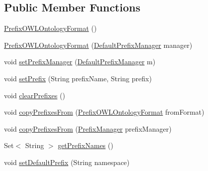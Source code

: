 \subsection*{Public Member Functions}
\begin{DoxyCompactItemize}
\item 
\hyperlink{classorg_1_1semanticweb_1_1owlapi_1_1vocab_1_1_prefix_o_w_l_ontology_format_ae2244e34e7cf323fe9a26837e640661a}{Prefix\-O\-W\-L\-Ontology\-Format} ()
\item 
\hyperlink{classorg_1_1semanticweb_1_1owlapi_1_1vocab_1_1_prefix_o_w_l_ontology_format_a25381dc4535de6180423825e12116137}{Prefix\-O\-W\-L\-Ontology\-Format} (\hyperlink{classorg_1_1semanticweb_1_1owlapi_1_1util_1_1_default_prefix_manager}{Default\-Prefix\-Manager} manager)
\item 
void \hyperlink{classorg_1_1semanticweb_1_1owlapi_1_1vocab_1_1_prefix_o_w_l_ontology_format_a9ff53f8c229d1ceb6ab4dadb83c5c920}{set\-Prefix\-Manager} (\hyperlink{classorg_1_1semanticweb_1_1owlapi_1_1util_1_1_default_prefix_manager}{Default\-Prefix\-Manager} m)
\item 
void \hyperlink{classorg_1_1semanticweb_1_1owlapi_1_1vocab_1_1_prefix_o_w_l_ontology_format_ab98a0884e0f5b91d0340843dfdb1d5f5}{set\-Prefix} (String prefix\-Name, String prefix)
\item 
void \hyperlink{classorg_1_1semanticweb_1_1owlapi_1_1vocab_1_1_prefix_o_w_l_ontology_format_a061ef2e964cc8b9678d618383c85f1fd}{clear\-Prefixes} ()
\item 
void \hyperlink{classorg_1_1semanticweb_1_1owlapi_1_1vocab_1_1_prefix_o_w_l_ontology_format_a6656b79b993875fd8ff4a06b6dd4feff}{copy\-Prefixes\-From} (\hyperlink{classorg_1_1semanticweb_1_1owlapi_1_1vocab_1_1_prefix_o_w_l_ontology_format}{Prefix\-O\-W\-L\-Ontology\-Format} from\-Format)
\item 
void \hyperlink{classorg_1_1semanticweb_1_1owlapi_1_1vocab_1_1_prefix_o_w_l_ontology_format_afed16ca2e164c492113675ee34040ca9}{copy\-Prefixes\-From} (\hyperlink{interfaceorg_1_1semanticweb_1_1owlapi_1_1model_1_1_prefix_manager}{Prefix\-Manager} prefix\-Manager)
\item 
Set$<$ String $>$ \hyperlink{classorg_1_1semanticweb_1_1owlapi_1_1vocab_1_1_prefix_o_w_l_ontology_format_a18b4291000ba1e590e2db8121108c7b0}{get\-Prefix\-Names} ()
\item 
void \hyperlink{classorg_1_1semanticweb_1_1owlapi_1_1vocab_1_1_prefix_o_w_l_ontology_format_a0af85751ccbf04d573af059ac3cecc58}{set\-Default\-Prefix} (String namespace)
\item 

\end{DoxyCompactItemize}
